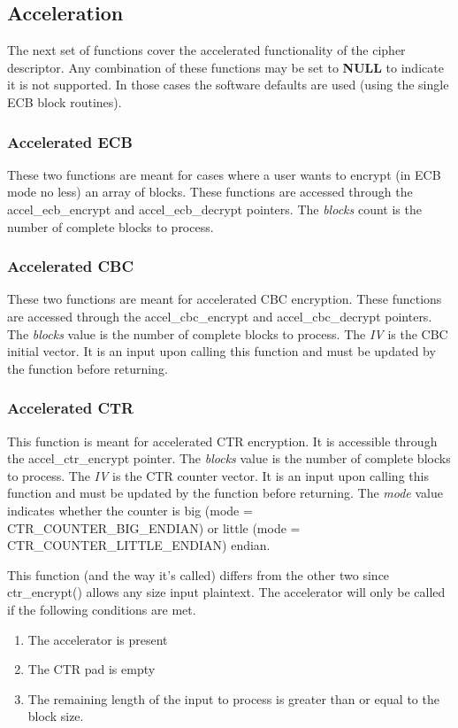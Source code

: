 \documentclass[synpaper]{book}
\begin{document}
\subsection{Acceleration}
The next set of functions cover the accelerated functionality of the cipher descriptor.  Any combination of these functions may be set to \textbf{NULL} to indicate
it is not supported.  In those cases the software defaults are used (using the single ECB block routines).

\subsubsection{Accelerated ECB}
These two functions are meant for cases where a user wants to encrypt (in ECB mode no less) an array of blocks.  These functions are accessed
through the accel\_ecb\_encrypt and accel\_ecb\_decrypt pointers.  The \textit{blocks} count is the number of complete blocks to process.

\subsubsection{Accelerated CBC} 
These two functions are meant for accelerated CBC encryption.  These functions are accessed through the accel\_cbc\_encrypt and accel\_cbc\_decrypt pointers.
The \textit{blocks} value is the number of complete blocks to process.  The \textit{IV} is the CBC initial vector.  It is an input upon calling this function and must be
updated by the function before returning.  

\subsubsection{Accelerated CTR}
This function is meant for accelerated CTR encryption.  It is accessible through the accel\_ctr\_encrypt pointer.
The \textit{blocks} value is the number of complete blocks to process.  The \textit{IV} is the CTR counter vector.  It is an input upon calling this function and must be
updated by the function before returning.  The \textit{mode} value indicates whether the counter is big (mode = CTR\_COUNTER\_BIG\_ENDIAN) or 
little (mode = CTR\_COUNTER\_LITTLE\_ENDIAN) endian.

This function (and the way it's called) differs from the other two since ctr\_encrypt() allows any size input plaintext.  The accelerator will only be
called if the following conditions are met.

\begin{enumerate}
   \item The accelerator is present
   \item The CTR pad is empty
   \item The remaining length of the input to process is greater than or equal to the block size.
\end{enumerate}
\end{document}
